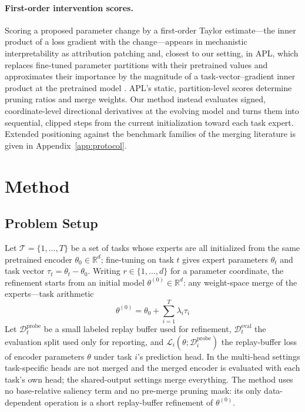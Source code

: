 \documentclass{article} %
\newcommand{\thetab}{\theta_0}
\newcommand{\taskvec}{\tau}
\newcommand{\loss}{\mathcal{L}}
\newcommand{\tasks}{\mathcal{T}}
\newcommand{\data}{\mathcal{D}}
\newcommand{\R}{\mathbb{R}}
\begin{document}
\paragraph{First-order intervention scores.}
Scoring a proposed parameter change by a first-order Taylor estimate---the inner product of a loss gradient with the change---appears in mechanistic interpretability as attribution patching \citep{syed2024attributionpatching,kramar2024atpstar} and, closest to our setting, in APL, which replaces fine-tuned parameter partitions with their pretrained values and approximates their importance by the magnitude of a task-vector--gradient inner product at the pretrained model \citep{kong2024apl}. APL's static, partition-level scores determine pruning ratios and merge weights. Our method instead evaluates signed, coordinate-level directional derivatives at the evolving model and turns them into sequential, clipped steps from the current initialization toward each task expert. Extended positioning against the benchmark families of the merging literature is given in Appendix~\ref{app:protocol}.

\section{Method}

\subsection{Problem Setup}
Let $\tasks=\{1,\ldots,T\}$ be a set of tasks whose experts are all initialized from the same pretrained encoder $\thetab\in\R^d$; fine-tuning on task $t$ gives expert parameters $\theta_t$ and task vector $\taskvec_t=\theta_t-\thetab$. Writing $r\in\{1,\ldots,d\}$ for a parameter coordinate, the refinement starts from an initial model $\theta^{(0)}\in\R^d$: any weight-space merge of the experts---task arithmetic
\begin{equation}
    \theta^{(0)} = \thetab + \sum_{i=1}^{T}\lambda_i\taskvec_i
    \label{eq:initial-merge}
\end{equation}
Let $\data_t^{\mathrm{probe}}$ be a small labeled replay buffer used for refinement, $\data_t^{\mathrm{eval}}$ the evaluation split used only for reporting, and $\loss_i(\theta;\data_i^{\mathrm{probe}})$ the replay-buffer loss of encoder parameters $\theta$ under task $i$'s prediction head. In the multi-head settings task-specific heads are not merged and the merged encoder is evaluated with each task's own head; the shared-output settings merge everything. The method uses no base-relative saliency term and no pre-merge pruning mask: its only data-dependent operation is a short replay-buffer refinement of $\theta^{(0)}$.
\end{document}
